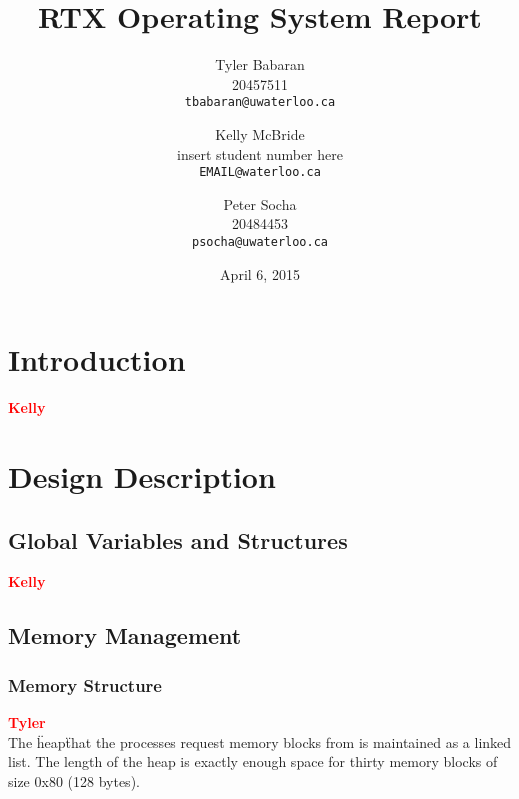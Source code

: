 \documentclass[12pt]{report}
\begin{document}
\title{RTX Operating System Report}

\author{
    Tyler Babaran\\
		20457511\\
    \texttt{tbabaran@uwaterloo.ca}
    \and
    Kelly McBride\\
		insert student number here\\
    \texttt{EMAIL@waterloo.ca}
    \and
    Peter Socha\\
		20484453\\
    \texttt{psocha@uwaterloo.ca}
}

\date{April 6, 2015}

\maketitle


\tableofcontents
\listofalgorithms
\listoffigures

\chapter{Introduction}

\textcolor{red}{\textbf{Kelly}} \\

\chapter{Design Description}

\section{Global Variables and Structures}

\textcolor{red}{\textbf{Kelly}} \\

\section{Memory Management}

\subsection{Memory Structure}

\textcolor{red}{\textbf{Tyler}} \\
The \"heap\" that the processes request memory blocks from is maintained as a linked list. The length of the heap is exactly enough space for thirty memory blocks of size 0x80 (128 bytes).\\
\end{document}
